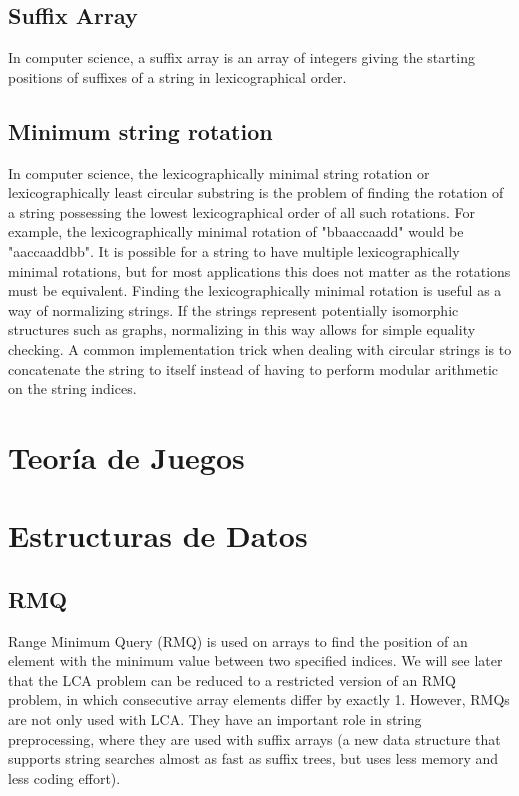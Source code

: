 \documentclass[10pt,letterpaper,twocolumn,twosided]{article}
\newcommand{\codigofuente}[1]{

\dotfill
}
\begin{document}
\codigofuente{src/string/aho.cpp}

\subsection{Suffix Array}

In computer science, a suffix array is an array of integers giving the starting positions of suffixes of a string in lexicographical order.

\codigofuente{src/string/suffixarray.cpp}

\subsection{Minimum string rotation}

In computer science, the lexicographically minimal string rotation or lexicographically least circular substring is the problem of finding the rotation of a string possessing the lowest lexicographical order of all such rotations. For example, the lexicographically minimal rotation of "bbaaccaadd" would be "aaccaaddbb". It is possible for a string to have multiple lexicographically minimal rotations, but for most applications this does not matter as the rotations must be equivalent. Finding the lexicographically minimal rotation is useful as a way of normalizing strings. If the strings represent potentially isomorphic structures such as graphs, normalizing in this way allows for simple equality checking. A common implementation trick when dealing with circular strings is to concatenate the string to itself instead of having to perform modular arithmetic on the string indices.

\codigofuente{src/string/minrot.cpp}

\section{Teoría de Juegos}

\section{Estructuras de Datos}

\subsection{RMQ}

Range Minimum Query (RMQ) is used on arrays to find the position of an element with the minimum value between two specified indices. We will see later that the LCA problem can be reduced to a restricted version of an RMQ problem, in which consecutive array elements differ by exactly 1.
However, RMQs are not only used with LCA. They have an important role in string preprocessing, where they are used with suffix arrays (a new data structure that supports string searches almost as fast as suffix trees, but uses less memory and less coding effort). 
\end{document}
